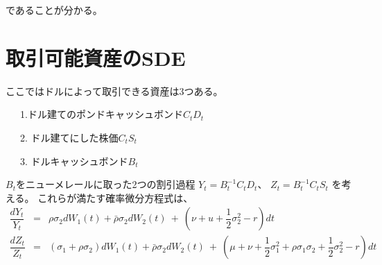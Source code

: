 \documentclass[uplatex,a4j,12pt,dvipdfmx]{jsarticle}
\begin{document}
であることが分かる。

\section{取引可能資産のSDE}

ここではドルによって取引できる資産は3つある。

\ \ \ 1.ドル建てのポンドキャッシュボンド$C_{t} D_{t}$

\ \ \ 2. ドル建てにした株価$C_{t} S_{t}$

\ \ \ 3. ドルキャッシュボンド$B_{t}$

$B_{t}$をニューメレールに取った2つの割引過程
$Y_{t} = B_{t}^{-1} C_{t} D_{t}$、
$Z_{t} = B_{t}^{-1} C_{t} S_{t}$
を考える。
これらが満たす確率微分方程式は、
%
%
\begin{eqnarray}
	\dfrac{dY_{t}}{Y_{t}}
	&=&
	\rho \sigma_{2} dW_{1}(t) +
	\bar{\rho} \sigma_{2} dW_{2}(t) \ + \ \left( \nu + u + \dfrac{1}{2} \sigma_{2}^{2} - r \right) dt
	\\
	\dfrac{dZ_{t}}{Z_{t}}
	&=&
	(\sigma_{1} + \rho \sigma_{2}) dW_{1}(t)
	+ \bar{\rho} \sigma_{2} dW_{2}(t)
	\ + \
	\left(
	\mu + \nu +
	\dfrac{1}{2} \sigma_{1}^{2} + \rho \sigma_{1} \sigma_{2} + \dfrac{1}{2} \sigma_{2}^{2}
	- r
	\right) dt
\end{eqnarray}
%
%
\end{document}
